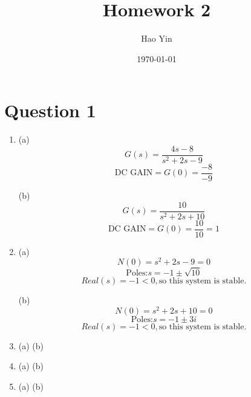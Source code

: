 \documentclass[12pt]{article}
\begin{document}
\title{Homework 2}
\author{Hao Yin}
\date{\today}
\maketitle

\section*{Question 1}
\begin{enumerate}[label=\roman*.]
    \item (a)
    \[G(s) = \frac{4s-8}{s^2+2s-9}\]
    \[\text{DC GAIN} = G(0) = \frac{-8}{-9}\]

    (b)
    \[G(s) = \frac{10}{s^2+2s+10}\]
    \[\text{DC GAIN} = G(0) = \frac{10}{10} = 1\]

    \item (a)
    \[N(0) = s^2+2s-9 = 0\]
    \[\text{Poles:} s = -1 \pm \sqrt{10}\]
    \[Real(s) = -1 < 0, \text{so this system is stable.}\]

    (b)
    \[N(0) = s^2+2s+10 = 0\]
    \[\text{Poles:} s = -1 \pm 3i\]
    \[Real(s) = -1 < 0, \text{so this system is stable.}\]

    \item (a)
    (b)

    \item (a)
    (b)

    \item (a)
    (b)

\end{enumerate}
\end{document}
